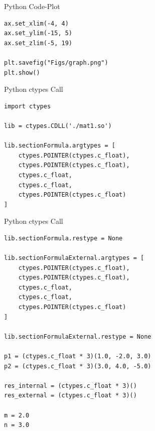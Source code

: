 \documentclass{beamer}
\begin{document}
\begin{frame}[fragile]{Python Code-Plot}
\begin{lstlisting}
ax.set_xlim(-4, 4)
ax.set_ylim(-15, 5)
ax.set_zlim(-5, 19)

plt.savefig("Figs/graph.png")
plt.show()
\end{lstlisting}
\end{frame}


\begin{frame}[fragile]{Python ctypes Call}
\begin{lstlisting}
import ctypes

lib = ctypes.CDLL('./mat1.so')

lib.sectionFormula.argtypes = [
    ctypes.POINTER(ctypes.c_float),
    ctypes.POINTER(ctypes.c_float),
    ctypes.c_float,
    ctypes.c_float,
    ctypes.POINTER(ctypes.c_float)
]
\end{lstlisting}
\end{frame}

\begin{frame}[fragile]{Python ctypes Call}
\begin{lstlisting}
lib.sectionFormula.restype = None

lib.sectionFormulaExternal.argtypes = [
    ctypes.POINTER(ctypes.c_float),
    ctypes.POINTER(ctypes.c_float),
    ctypes.c_float,
    ctypes.c_float,
    ctypes.POINTER(ctypes.c_float)
]

lib.sectionFormulaExternal.restype = None

p1 = (ctypes.c_float * 3)(1.0, -2.0, 3.0)
p2 = (ctypes.c_float * 3)(3.0, 4.0, -5.0)

res_internal = (ctypes.c_float * 3)()
res_external = (ctypes.c_float * 3)()

m = 2.0
n = 3.0
\end{lstlisting}
\end{frame}
\end{document}
